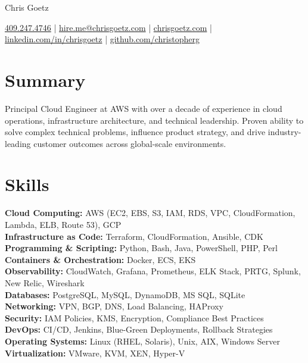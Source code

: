 \documentclass[11pt]{article}
\begin{document}
\centerline{\Huge Chris Goetz}
\vspace{5pt}
\centerline{\href{tel:409.247.4746}{409.247.4746} | \href{mailto:hire.me@chrisgoetz.com}{hire.me@chrisgoetz.com} | \href{https://www.chrisgoetz.com}{chrisgoetz.com} | \href{https://linkedin.com/in/chrisgoetz}{linkedin.com/in/chrisgoetz} | \href{https://github.com/christopherg}{github.com/christopherg}}
\vspace{-10pt}

\section*{Summary}
Principal Cloud Engineer at AWS with over a decade of experience in cloud operations, infrastructure architecture, and technical leadership. Proven ability to solve complex technical problems, influence product strategy, and drive industry-leading customer outcomes across global-scale environments.

\vspace{-6.5pt}

\section*{Skills}
\textbf{Cloud Computing:} AWS (EC2, EBS, S3, IAM, RDS, VPC, CloudFormation, Lambda, ELB, Route 53), GCP \\
\textbf{Infrastructure as Code:} Terraform, CloudFormation, Ansible, CDK \\
\textbf{Programming \& Scripting:} Python, Bash, Java, PowerShell, PHP, Perl \\
\textbf{Containers \& Orchestration:} Docker, ECS, EKS \\
\textbf{Observability:} CloudWatch, Grafana, Prometheus, ELK Stack, PRTG, Splunk, New Relic, Wireshark \\
\textbf{Databases:} PostgreSQL, MySQL, DynamoDB, MS SQL, SQLite \\
\textbf{Networking:} VPN, BGP, DNS, Load Balancing, HAProxy \\
\textbf{Security:} IAM Policies, KMS, Encryption, Compliance Best Practices \\
\textbf{DevOps:} CI/CD, Jenkins, Blue-Green Deployments, Rollback Strategies \\
\textbf{Operating Systems:} Linux (RHEL, Solaris), Unix, AIX, Windows Server \\
\textbf{Virtualization:} VMware, KVM, XEN, Hyper-V

\vspace{-6.5pt}
\end{document}
